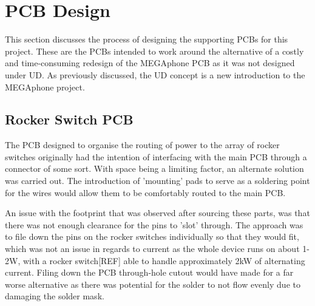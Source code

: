 
\section{PCB Design}
This section discusses the process of designing the supporting PCBs for this project.
These are the PCBs intended to work around the alternative of a costly and time-consuming redesign of the MEGAphone PCB as it was not designed under UD.
As previously discussed, the UD concept is a new introduction to the MEGAphone project.

\subsection{Rocker Switch PCB}

The PCB designed to organise the routing of power to the array of rocker switches originally had the intention of interfacing with the main PCB through a connector of some sort.
With space being a limiting factor, an alternate solution was carried out.
The introduction of 'mounting' pads to serve as a soldering point for the wires would allow them to be comfortably routed to the main PCB.

An issue with the footprint that was observed after sourcing these parts, was that there was not enough clearance for the pins to 'slot' through.
The approach was to file down the pins on the rocker switches individually so that they would fit, which was not an issue in regards to current as the whole device runs on about 1-2W, with a rocker switch[REF] able to handle approximately 2kW of alternating current.
Filing down the PCB through-hole cutout would have made for a far worse alternative as there was potential for the solder to not flow evenly due to damaging the solder mask. %


